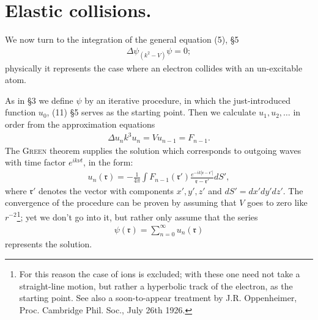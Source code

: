 \documentclass[a4paper,11pt]{article}
\newcommand{\?}[2]{#1\footnote{\textsc{Translator note}: #2}}
\newcommand{\nequ}[2]{\begin{align*}\tag{#1}#2\end{align*}}
\newcommand{\uequ}[1]{\begin{align*}#1\end{align*}}
\renewcommand{\exp}[1]{e^{#1}}
\begin{document}
\section{Elastic collisions.}
We now turn to the integration of the general equation (5), \S5
\nequ{1}{
\Delta\psi _ (k^2-V)\psi = 0;
}
physically it represents the case where an electron collides with an un-excitable atom.

As in \S3 we define $\psi$ by an iterative procedure, in which the just-introduced function $u_0$, (11) \S5 serves as the starting point. Then we calculate $u_1, u_2, \dots$ in order from the approximation equations
\nequ{2}{
\Delta u_n k^3 u_n = V u_{n-1} =F_{n-1}.
}
The \textsc{Green} theorem supplies the solution which corresponds to outgoing waves with time factor $\exp{ik\nu t}$, in the form:
\nequ{3}{
u_n(\mathfrak{r}) = -\frac{1}{4\pi}\int F_{n-1}(\mathfrak{r}')
\frac{\exp{-ik|\mathfrak{r}-\mathfrak{r}'|}}{\mathfrak{r}-\mathfrak{r}'}dS',
}
where $\mathfrak{r}'$ denotes the vector with components $x',y',z'$ and $dS' = {dx'}{dy'}{dz'}$. The convergence of the procedure can be proven by assuming that $V$ goes to zero like $r^{-2}$\footnote{For this reason the case of ions is excluded; with these one need not take a straight-line motion, but rather a hyperbolic track of the electron, as the starting point. See also a soon-to-appear treatment by J.R. Oppenheimer, Proc. Cambridge Phil. Soc., July 26th 1926. }; yet we don't go into it, but rather only assume that the series
\uequ{
\psi(\mathfrak{r}) = \sum\limits_{n=0}^{\infty} u_n(\mathfrak{r})
}
represents the solution.
\end{document}

